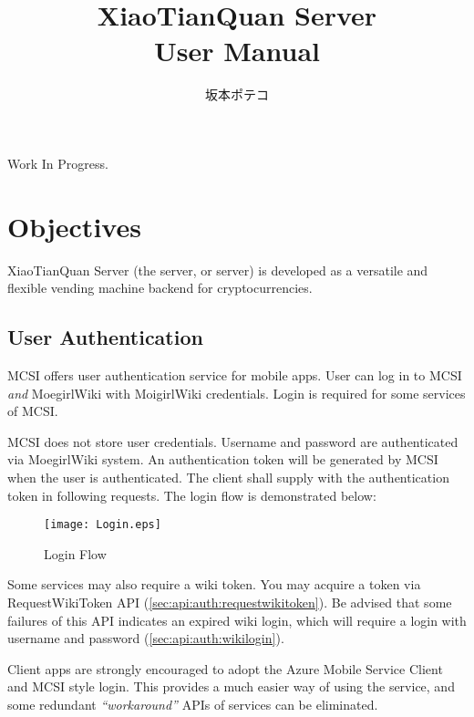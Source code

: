 \documentclass[a4paper,11pt]{report}
\begin{document}
\title{\Huge{XiaoTianQuan Server\\ \vspace{1.5em} User Manual}}
\author{坂本ポテコ}
\maketitle
\clearpage

\tableofcontents
\clearpage


{\Huge{Work In Progress.}}

\chapter{Objectives}

XiaoTianQuan Server (the server, or server) is developed as a versatile and flexible vending machine backend for cryptocurrencies.


\section{User Authentication}

MCSI offers user authentication service for mobile apps. User can log in to MCSI \emph{and} MoegirlWiki with MoigirlWiki credentials. Login is required for some services of MCSI.

MCSI does not store user credentials. Username and password are authenticated via MoegirlWiki system. An authentication token will be generated by MCSI when the user is authenticated. The client shall supply with the authentication token in following requests. The login flow is demonstrated below:

\begin{figure}[htbp]
\minipage[b][][b]{\textwidth}
    \texttt{[image: Login.eps]}
    \caption{Login Flow}
    \label{fig:loginflow}
\endminipage\hfill
\end{figure}

Some services may also require a wiki token. You may acquire a token via RequestWikiToken API (\ref{sec:api:auth:requestwikitoken}). Be advised that some failures of this API indicates an expired wiki login, which will require a login with username and password (\ref{sec:api:auth:wikilogin}).

Client apps are strongly encouraged to adopt the Azure Mobile Service Client and MCSI style login. This provides a much easier way of using the service, and some redundant \emph{``workaround''} APIs of services can be eliminated.
\end{document}
